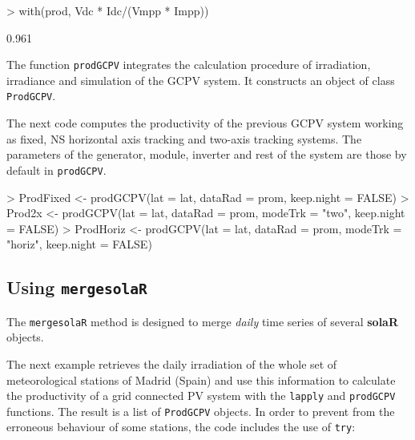 \documentclass[a4paper]{article}
\renewenvironment{Schunk}{\vspace{\topsep}}{\vspace{\topsep}}
\newcommand{\code}[1]{{\texttt{#1}}}
\newcommand{\pkg}[1]{{\textbf{#1}}}
\begin{document}
\begin{Schunk}
\begin{Sinput}
> with(prod, Vdc * Idc/(Vmpp * Impp))
\end{Sinput}
\begin{Soutput}
[1] 0.961
\end{Soutput}
\end{Schunk}

The function \code{prodGCPV} integrates the calculation procedure of
irradiation, irradiance and simulation of the GCPV system. It
constructs an object of class \code{ProdGCPV}.

The next code computes the productivity of the previous GCPV system
working as fixed, NS horizontal axis tracking and two-axis tracking
systems.  The parameters of the generator, module, inverter and rest
of the system are those by default in \code{prodGCPV}. 

\begin{Schunk}
\begin{Sinput}
> ProdFixed <- prodGCPV(lat = lat, dataRad = prom, keep.night = FALSE)
> Prod2x <- prodGCPV(lat = lat, dataRad = prom, modeTrk = "two", 
     keep.night = FALSE)
> ProdHoriz <- prodGCPV(lat = lat, dataRad = prom, modeTrk = "horiz", 
     keep.night = FALSE)
\end{Sinput}
\end{Schunk}


\subsection[Using mergesolaR]{Using \code{mergesolaR}}
\label{sec:mergesolar}

The \code{mergesolaR} method is designed to merge \emph{daily} time series
of several \pkg{solaR} objects. 

The next example retrieves the daily irradiation of the whole set of
meteorological stations of Madrid (Spain) and use this information to
calculate the productivity of a grid connected PV system with the
\code{lapply} and \code{prodGCPV} functions. The result is a list of
\code{ProdGCPV} objects. In order to prevent from the erroneous
behaviour of some stations, the code includes the use of \code{try}:

\begin{Schunk}
\end{Schunk}
\end{document}
